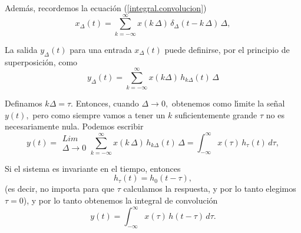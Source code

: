 Además, recordemos la ecuaci\'{o}n (\ref{integral.convolucion})
\begin{equation}
 x_{\Delta }\left( t\right) =
  \sum_{k=-\infty }^{\infty }x\left( k \, \Delta \right) \, \delta _{\Delta }\left( t-k \, \Delta \right) \, \Delta ,
\end{equation}

La salida $y_{\Delta }\left( t\right) $ para una entrada $x_{\Delta }\left( t\right) $ puede 
definirse, por el principio de superposici\'{o}n, como 
\begin{equation}
        y_{\Delta }\left( t\right) =
        \sum_{k=-\infty }^{\infty }x\left( k\Delta \right) \, h_{k\Delta }\left( t\right) \, \Delta
\end{equation}
 
Definamos $k\Delta =\tau .$ Entonces, cuando $\Delta \rightarrow 0,$ obtenemos como l\'{\i}mite la 
se\~{n}al $y(t),$ pero como siempre vamos a tener un $k$ suficientemente grande $\tau $ no es 
necesariamente nula. Podemos escribir 
\begin{equation}
        y\left( t\right) = 
                \begin{array}{l}
                        Lim \\ 
                        \Delta \rightarrow 0
                \end{array}
                \sum_{k=-\infty }^{\infty }x\left( k \, \Delta \right) \, h_{k\Delta }\left(t\right) \, \Delta =
                        \int_{-\infty }^{\infty }x\left( \tau \right) \, h_{\tau}\left( t\right) \, d\tau ,
\end{equation}

Si el sistema es invariante en el tiempo, entonces 
\begin{equation}
h_{\tau }\left( t\right) =h_{0}\left( t-\tau \right) ,
\end{equation}
(es decir, no importa para que $\tau $ calculamos la respuesta, y por lo tanto elegimos $\tau =0$), y por 
lo tanto obtenemos la integral de convolución 
\begin{equation}
        y\left( t\right) =\int_{-\infty }^{\infty }x\left( \tau \right) \, h\left(t-\tau \right) \, d\tau .
\end{equation}

